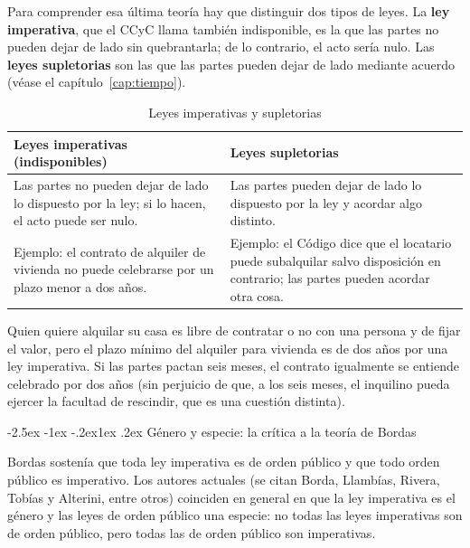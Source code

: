 \documentclass[12pt,oneside]{book}
\makeatletter
\renewcommand\subsection{\@startsection{subsection}{2}{\z@}%
  {-2.5ex \@plus -1ex \@minus -.2ex}{1ex \@plus .2ex}%
  {\normalfont\normalsize\bfseries}}
\makeatother
\begin{document}
Para comprender esa última teoría hay que distinguir dos tipos de leyes. La \textbf{ley imperativa}, que el CCyC llama también indisponible, es la que las partes no pueden dejar de lado sin quebrantarla; de lo contrario, el acto sería nulo. Las \textbf{leyes supletorias} son las que las partes pueden dejar de lado mediante acuerdo (véase el capítulo~\ref{cap:tiempo}).

\begin{table}[H]
\centering
\begin{tabularx}{\textwidth}{YY}
\toprule
\textbf{Leyes imperativas (indisponibles)} & \textbf{Leyes supletorias} \\
\midrule
Las partes no pueden dejar de lado lo dispuesto por la ley; si lo hacen, el acto puede ser nulo. & Las partes pueden dejar de lado lo dispuesto por la ley y acordar algo distinto. \\
Ejemplo: el contrato de alquiler de vivienda no puede celebrarse por un plazo menor a dos años. & Ejemplo: el Código dice que el locatario puede subalquilar salvo disposición en contrario; las partes pueden acordar otra cosa. \\
\bottomrule
\end{tabularx}
\caption{Leyes imperativas y supletorias}
\end{table}

\begin{ejemplo}
Quien quiere alquilar su casa es libre de contratar o no con una persona y de fijar el valor, pero el plazo mínimo del alquiler para vivienda es de dos años por una ley imperativa. Si las partes pactan seis meses, el contrato igualmente se entiende celebrado por dos años (sin perjuicio de que, a los seis meses, el inquilino pueda ejercer la facultad de rescindir, que es una cuestión distinta).
\end{ejemplo}

\subsection{Género y especie: la crítica a la teoría de Bordas}

Bordas sostenía que toda ley imperativa es de orden público y que todo orden público es imperativo. Los autores actuales (se citan Borda, Llambías, Rivera, Tobías y Alterini, entre otros) coinciden en general en que la ley imperativa es el género y las leyes de orden público una especie: no todas las leyes imperativas son de orden público, pero todas las de orden público son imperativas.
\end{document}
